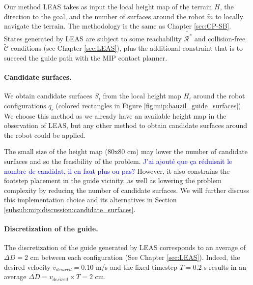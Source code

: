 Our method LEAS takes as input the local height map of the terrain $H$, the direction to the goal, and the number of surfaces around the robot $\tilde{m}$ to locally navigate the terrain. 
The methodology is the same as Chapter \ref{sec:CP-SB}.
States generated by LEAS are subject to some reachability $\tilde{\mathcal{R}^*}$ and collision-free $\tilde{\mathcal{C}}$ conditions (see Chapter \ref{sec:LEAS}), plus the additional constraint that is to succeed the guide path with the MIP contact planner.


\paragraph{Candidate surfaces.}
We obtain candidate surfaces $S_i$ from the local height map $H_i$ around the robot configurations $q_i$ (colored rectangles in Figure \ref{fig:mip:bauzil_guide_surfaces}).
We choose this method as we already have an available height map in the observation of LEAS, but any other method to obtain candidate surfaces around the robot could be applied.

The small size of the height map (80x80 cm) may lower the number of candidate surfaces and so the feasibility of the problem. 
 \textcolor{blue}{J'ai ajouté que ça réduisait le nombre de candidat, il en faut plus ou pas?}
However, it also constrains the footstep placement in the guide vicinity, as well as lowering the problem complexity by reducing the number of candidate surfaces.
We will further discuss this implementation choice and its alternatives in Section \ref{subsub:mip:discussion:candidate_surfaces}.


\paragraph{Discretization of the guide.}
The discretization of the guide generated by LEAS corresponds to an average of $\Delta D=2$ cm between each configuration (See Chapter \ref{sec:LEAS}). Indeed, the desired velocity $v_{desired}=0.10$ m/s and the fixed timestep $T=0.2$ s results in an average $\Delta D= v_{desired} \times T = 2$ cm.

